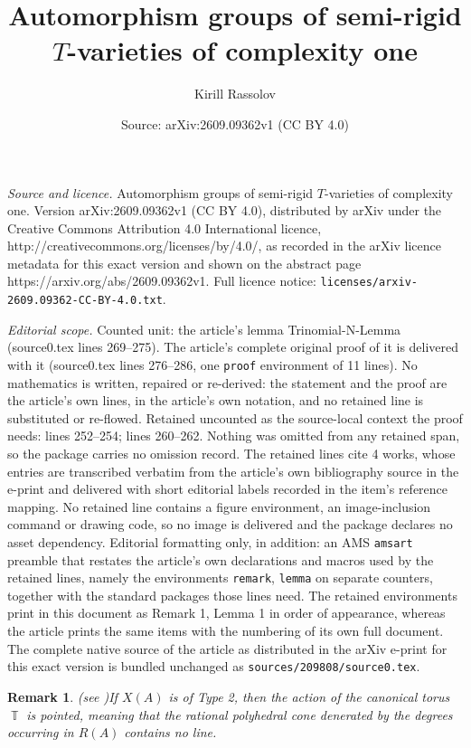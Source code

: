 \documentclass[10pt,a4paper]{amsart}
\title{Automorphism groups of semi-rigid $T$-varieties of complexity one}
\author{Kirill Rassolov}
\date{Source: arXiv:2609.09362v1 (CC BY 4.0)}
\newtheorem{remark}{Remark}
\DeclareMathOperator{\TT}{\mathbb T}
\begin{document}
\maketitle

\noindent\emph{Source and licence.} Automorphism groups of semi-rigid $T$-varieties of complexity one. Version arXiv:2609.09362v1 (CC BY 4.0), distributed by arXiv under the Creative Commons Attribution 4.0 International licence, http://creativecommons.org/licenses/by/4.0/, as recorded in the arXiv licence metadata for this exact version and shown on the abstract page https://arxiv.org/abs/2609.09362v1. Full licence notice: \texttt{licenses/arxiv-2609.09362-CC-BY-4.0.txt}.\par\smallskip

\noindent\textit{Editorial scope.} Counted unit: the article's lemma Trinomial-N-Lemma (source0.tex lines 269--275). The article's complete original proof of it is delivered with it (source0.tex lines 276--286, one \texttt{proof} environment of 11 lines). No mathematics is written, repaired or re-derived: the statement and the proof are the article's own lines, in the article's own notation, and no retained line is substituted or re-flowed.  Retained uncounted as the source-local context the proof needs: lines 252--254; lines 260--262.  Nothing was omitted from any retained span, so the package carries no omission record.  The retained lines cite 4 works, whose entries are transcribed verbatim from the article's own bibliography source in the e-print and delivered with short editorial labels recorded in the item's reference mapping.  No retained line contains a figure environment, an image-inclusion command or drawing code, so no image is delivered and the package declares no asset dependency.  Editorial formatting only, in addition: an AMS \texttt{amsart} preamble that restates the article's own declarations and macros used by the retained lines, namely the environments \texttt{remark}, \texttt{lemma} on separate counters, together with the standard packages those lines need.  The retained environments print in this document as Remark 1, Lemma 1 in order of appearance, whereas the article prints the same items with the numbering of its own full document.  The complete native source of the article as distributed in the arXiv e-print for this exact version is bundled unchanged as \texttt{sources/209808/source0.tex}.
\begin{remark} (see \cite{HW})\label{RemarkPoint}
    If $X(A)$ is of Type 2, then the action of the canonical torus $\TT$ is pointed, meaning that the rational polyhedral cone denerated by the degrees occurring in $R(A)$ contains no line.
\end{remark}
\end{document}
